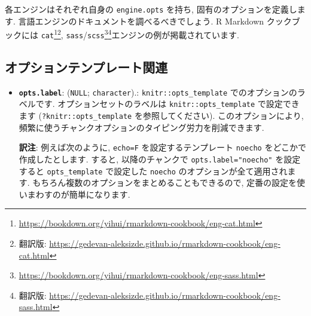 \documentclass[
  11pt,
  lualatex,ja=standard,jafont=noto]{bxjsreport}
\newenvironment{Shaded}{\begin{snugshade}}{\end{snugshade}}
\newcommand{\AttributeTok}[1]{\textcolor[rgb]{0.77,0.63,0.00}{#1}}
\newcommand{\FunctionTok}[1]{\textcolor[rgb]{0.00,0.00,0.00}{#1}}
\newcommand{\NormalTok}[1]{#1}
\newcommand{\SpecialCharTok}[1]{\textcolor[rgb]{0.00,0.00,0.00}{#1}}
\newcommand{\StringTok}[1]{\textcolor[rgb]{0.31,0.60,0.02}{#1}}
\renewcommand{\href}[2]{#2\footnote{\url{#1}}}
\begin{document}
\begin{itemize}
\begin{Shaded}
\end{Shaded}

  各エンジンはそれぞれ自身の \texttt{engine.opts} を持ち, 固有のオプションを定義します. 言語エンジンのドキュメントを調べるべきでしょう. R Markdown クックブックには \href{https://bookdown.org/yihui/rmarkdown-cookbook/eng-cat.html}{\texttt{cat}}\footnote{翻訳版: \url{https://gedevan-aleksizde.github.io/rmarkdown-cookbook/eng-cat.html}}, \href{https://bookdown.org/yihui/rmarkdown-cookbook/eng-sass.html}{\texttt{sass}/\texttt{scss}}\footnote{翻訳版: \url{https://gedevan-aleksizde.github.io/rmarkdown-cookbook/eng-sass.html}}エンジンの例が掲載されています.
\end{itemize}

\hypertarget{ux30aaux30d7ux30b7ux30e7ux30f3ux30c6ux30f3ux30d7ux30ecux30fcux30c8ux95a2ux9023}{%
\subsection{オプションテンプレート関連}\label{ux30aaux30d7ux30b7ux30e7ux30f3ux30c6ux30f3ux30d7ux30ecux30fcux30c8ux95a2ux9023}}

\begin{itemize}
\item
  \textbf{\texttt{opts.label}}: (\texttt{NULL}; \texttt{character}).: \texttt{knitr::opts\_template} でのオプションのラベルです. オプションセットのラベルは \texttt{knitr::opts\_template} で設定できます (\texttt{?knitr::opts\_template} を参照してください). このオプションにより, 頻繁に使うチャンクオプションのタイピング労力を削減できます.

  \textbf{訳注}: 例えば次のように, \texttt{echo=F} を設定するテンプレート \texttt{noecho} をどこかで作成したとします. すると, 以降のチャンクで \texttt{opts.label="noecho"} を設定すると \texttt{opts\_template} で設定した \texttt{noecho} のオプションが全て適用されます. もちろん複数のオプションをまとめることもできるので, 定番の設定を使いまわすのが簡単になります.

\begin{Shaded}
\end{Shaded}
\end{itemize}
\end{document}
